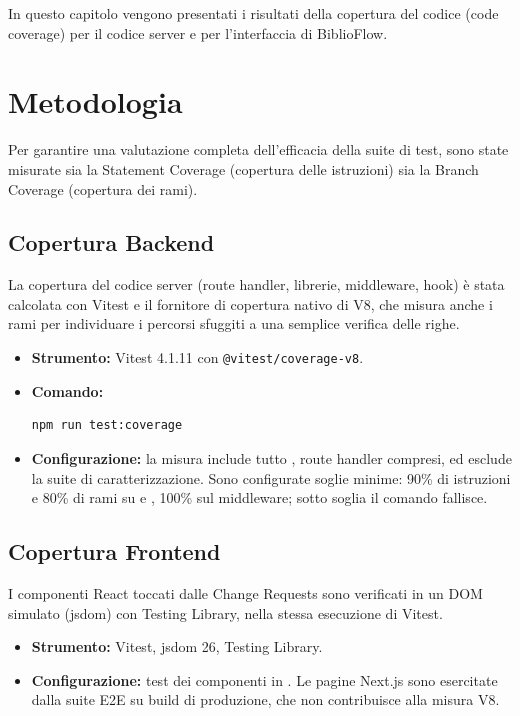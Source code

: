 \documentclass[11pt,a4paper,oneside,openany]{book}
\begin{document}
In questo capitolo vengono presentati i risultati della copertura del codice
(code coverage) per il codice server e per l'interfaccia di BiblioFlow.

\section{Metodologia}

Per garantire una valutazione completa dell'efficacia della suite di test,
sono state misurate sia la Statement Coverage (copertura delle istruzioni) sia
la Branch Coverage (copertura dei rami).

\subsection{Copertura Backend}

La copertura del codice server (route handler, librerie, middleware, hook) è
stata calcolata con Vitest e il fornitore di copertura nativo di V8, che
misura anche i rami per individuare i percorsi sfuggiti a una semplice
verifica delle righe.
\begin{itemize}
  \item \textbf{Strumento:} Vitest 4.1.11 con \texttt{@vitest/coverage-v8}.
  \item \textbf{Comando:}
\begin{lstlisting}
npm run test:coverage
\end{lstlisting}
  \item \textbf{Configurazione:} la misura include tutto , route
        handler compresi, ed esclude la suite di caratterizzazione. Sono
        configurate soglie minime: 90\% di istruzioni e 80\% di rami su
         e , 100\% sul middleware; sotto
        soglia il comando fallisce.
\end{itemize}

\subsection{Copertura Frontend}

I componenti React toccati dalle Change Requests sono verificati in un DOM
simulato (jsdom) con Testing Library, nella stessa esecuzione di Vitest.
\begin{itemize}
  \item \textbf{Strumento:} Vitest, jsdom 26, Testing Library.
  \item \textbf{Configurazione:} test dei componenti in
        . Le pagine Next.js sono esercitate dalla
        suite E2E su build di produzione, che non contribuisce alla misura V8.
\end{itemize}
\end{document}
